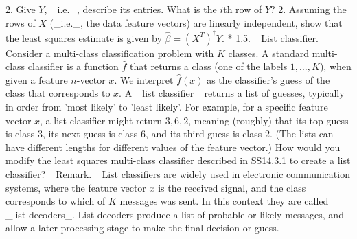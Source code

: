 2. Give \(Y\), _i.e._, describe its entries. What is the \(i\)th row of \(Y\)? 2. Assuming the rows of \(X\) (_i.e._, the data feature vectors) are linearly independent, show that the least squares estimate is given by \(\hat{\beta}=(X^{T})^{\dagger}Y\).
* 1.5. _List classifier._ Consider a multi-class classification problem with \(K\) classes. A standard multi-class classifier is a function \(\hat{f}\) that returns a class (one of the labels \(1,\ldots,K\)), when given a feature \(n\)-vector \(x\). We interpret \(\hat{f}(x)\) as the classifier's guess of the class that corresponds to \(x\). A _list classifier_ returns a list of guesses, typically in order from 'most likely' to 'least likely'. For example, for a specific feature vector \(x\), a list classifier might return \(3,6,2\), meaning (roughly) that its top guess is class \(3\), its next guess is class \(6\), and its third guess is class \(2\). (The lists can have different lengths for different values of the feature vector.) How would you modify the least squares multi-class classifier described in SS14.3.1 to create a list classifier? _Remark._ List classifiers are widely used in electronic communication systems, where the feature vector \(x\) is the received signal, and the class corresponds to which of \(K\) messages was sent. In this context they are called _list decoders_. List decoders produce a list of probable or likely messages, and allow a later processing stage to make the final decision or guess.

